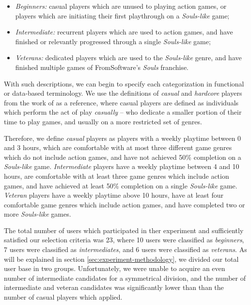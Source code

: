 \begin{itemize}
    \item{\emph{Beginners:} casual players which are unused to playing action games, or players which are initiating their first playthrough on a \emph{Souls-like} game;}
    \item{\emph{Intermediate:} recurrent players which are used to action games, and have finished or relevantly progressed through a single \emph{Souls-like} game;}
    \item{\emph{Veterans:} dedicated players which are used to the \emph{Souls-like} genre, and have finished multiple games of FromSoftware's \emph{Souls} franchise.}
\end{itemize}


With such descriptions, we can begin to specify each categorization in functional or data-based terminology. We use the definitions of \emph{casual} and \emph{hardcore} players from the work of  \citet{ARTICLE_CasualsHardcoreDefinition} as a reference, where casual players are defined as individuals which perform the act of play \emph{casually} -- who dedicate a smaller portion of their time to play games, and usually on a more restricted set of genres.

Therefore, we define \emph{casual} players as players with a weekly playtime between 0 and 3 hours, which are comfortable with at most three different game genres which do not include action games, and have not achieved 50\% completion on a \emph{Souls-like} game. \emph{Intermediate} players have a weekly playtime between 4 and 10 hours, are comfortable with at least three game genres which include action games, and have achieved at least 50\% completion on a single \emph{Souls-like} game. \emph{Veteran} players have a weekly playtime above 10 hours, have at least four comfortable game genres which include action games, and have completed two or more \emph{Souls-like} games.



The total number of users which participated in ther experiment and sufficiently satisfied our selection criteria was 23, where 10 users were classified as \emph{beginners}, 7 users were classified as \emph{intermediates}, and 6 users were classified as \emph{veterans}. As will be explained in section \ref{sec:experiment-methodology}, we divided our total user base in two groups. Unfortunately, we were unable to acquire an even number of intermediate candidates for a symmetrical division, and the number of intermediate and veteran candidates was significantly lower than than the number of casual players which applied. 

